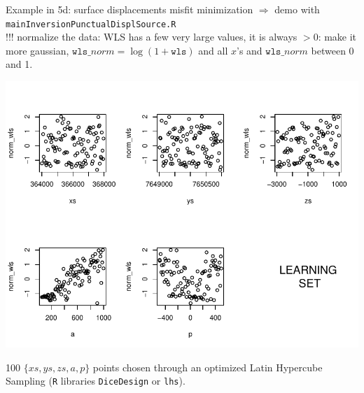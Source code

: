 \documentclass{beamer}
\begin{document}
\begin{frame}{}
\begin{exampleblock}{Example in 5d: surface displacements misfit minimization}
$\Rightarrow$ demo with \texttt{mainInversionPunctualDisplSource.R}\\
!!! normalize the data: WLS has a few very large values, it is always $>0$: make it more gaussian, 
$\mathtt{wls}\_norm = \log(1+\mathtt{wls})$ and all $x$'s and $\mathtt{wls}\_norm$ between 0 and 1.
\begin{minipage}[c]{0.6\textwidth}
\begin{center}
\includegraphics[width=\textwidth]{figures/misfit_learn_set} 
\end{center}
\end{minipage}
\hspace{0.3cm}
\begin{minipage}[c]{0.30\textwidth}
{\small 100 $\{xs,ys,zs,a,p\}$ points chosen through an optimized Latin Hypercube Sampling 
(\texttt{R} libraries \texttt{DiceDesign} or \texttt{lhs}).}\\
\end{minipage}
\end{exampleblock}
\end{frame}
\end{document}
